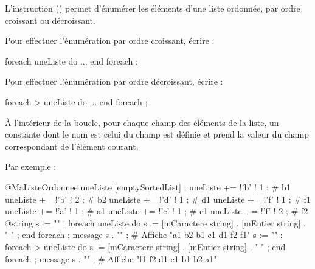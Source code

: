 L'instruction  () permet d'énumérer les éléments d'une liste ordonnée, par ordre croissant ou décroissant.

Pour effectuer l'énumération par ordre croissant, écrire :
\begin{galgascode}
foreach uneListe do
  ...
end foreach ;
\end{galgascode}

Pour effectuer l'énumération par ordre décroissant, écrire :
\begin{galgascode}
foreach > uneListe do
  ...
end foreach ;
\end{galgascode}

À l'intérieur de la boucle, pour chaque champ des éléments de la liste, un constante dont le nom est celui du champ est définie et prend la valeur du champ correspondant de l'élément courant.

Par exemple :

\begin{galgascode}
@MaListeOrdonnee uneListe [emptySortedList] ;
uneListe += !'b' ! 1 ; # b1
uneListe += !'b' ! 2 ; # b2
uneListe += !'d' ! 1 ; # d1
uneListe += !'f' ! 1 ; # f1
uneListe += !'a' ! 1 ; # a1
uneListe += !'c' ! 1 ; # c1
uneListe += !'f' ! 2 ; # f2
@string s := "" ;
foreach uneListe do
  s .= [mCaractere string] . [mEntier string] . " " ;
end foreach ;
message s . "\n" ; # Affiche "a1 b2 b1 c1 d1 f2 f1"
s := "" ;
foreach > uneListe do
  s .= [mCaractere string] . [mEntier string] . " " ;
end foreach ;
message s . "\n" ; # Affiche "f1 f2 d1 c1 b1 b2 a1"
\end{galgascode}
